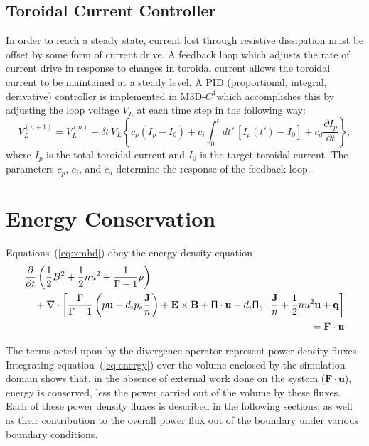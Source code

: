 \documentclass[letterpaper]{book}
\newcommand{\dt}{\ensuremath{\delta t}}
\newcommand{\ddt}[1]{\frac{\partial #1}{\partial t}}
\renewcommand{\vec}[1]{\ensuremath{\mathbf{#1}}}
\newcommand{\tensor}[1]{\mathsf{#1}}
\newcommand{\B}{\vec{B}}
\newcommand{\E}{\vec{E}}
\renewcommand{\u}{\vec{u}}
\newcommand{\F}{\vec{F}}
\renewcommand{\j}{\vec{J}}
\newcommand{\q}{\vec{q}}
\newcommand{\jn}{\frac{\j}{n}}
\renewcommand{\P}{\tensor{\Pi}}
\newcommand{\codename}{M3D-$C^1$}
\renewcommand{\div}[1]{\nabla \cdot #1}
\begin{document}
\subsection{Toroidal Current Controller \label{sec:current_controller}}

In order to reach a steady state, current lost through resistive
dissipation must be offset by some form of current drive.  A feedback
loop which adjusts the rate of current drive in response to changes in
toroidal current allows the toroidal current to be maintained at a
steady level.  A PID (proportional, integral, derivative) controller
is implemented in \codename which accomplishes this by adjusting the
loop voltage $V_L$ at each time step in the following way:
\begin{equation}
  V_L^{(n+1)} = V_L^{(n)} - \dt\, V_L \left\{ c_p (I_p - I_0) + c_i
  \int_0^t dt'\,[I_p(t') - I_0] + c_d \ddt{I_p} \right\},
\end{equation}
where $I_p$ is the total toroidal current and $I_0$ is the target
toroidal current.  The parameters $c_p$, $c_i$, and $c_d$ determine
the response of the feedback loop.


\section{Energy Conservation}

Equations~(\ref{eq:xmhd}) obey the energy density equation
\begin{eqnarray}
 \lefteqn{\ddt{}\left(\frac{1}{2}B^2 + \frac{1}{2}n u^2 + \frac{1}{\Gamma-1}p
  \right)} \nonumber \\ & & \mbox{}+ \div{\left[
      \frac{\Gamma}{\Gamma-1} \left(p \u - d_i p_e \jn\right)
      + \E \times \B + \P \cdot \u - d_i \P_e \cdot \jn
      + \frac{1}{2} n u^2 \u + \q \right]} \nonumber
 \\ & & = \F \cdot \u \label{eq:energy}
\end{eqnarray}

The terms acted upon by the divergence operator represent power
density fluxes.  Integrating equation~(\ref{eq:energy}) over the
volume enclosed by the simulation domain shows that, in the absence of
external work done on the system ($\F \cdot \u$), energy is conserved,
less the power carried out of the volume by these fluxes.  Each of
these power density fluxes is described in the following sections, as
well as their contribution to the overall power flux out of the
boundary under various boundary conditions.
\end{document}
